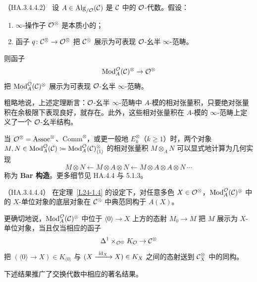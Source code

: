 \begin{theorem}\label{L24-1.4}（HA.3.4.4.2）
设 $A\in\operatorname{Alg}_{/\mathcal{O}}(\mathcal{C})$ 是 $\mathcal{C}$ 中的 $\mathcal{O}$-代数。假设：
\begin{enumerate}[label=(\roman*),leftmargin=2.4em,itemsep=0.1em]
\item $\infty$-操作子 $\mathcal{O}^{\otimes}$ 是本质小的；
\item 函子 $q\colon\mathcal{C}^{\otimes}\to\mathcal{O}^{\otimes}$ 把 $\mathcal{C}^{\otimes}$ 展示为可表现 $\mathcal{O}$-幺半 $\infty$-范畴。
\end{enumerate}
则函子
\[
\operatorname{Mod}^{\mathcal{O}}_{A}(\mathcal{C})^{\otimes}\to\mathcal{O}^{\otimes}
\]
把 $\operatorname{Mod}^{\mathcal{O}}_{A}(\mathcal{C})^{\otimes}$ 展示为可表现 $\mathcal{O}$-幺半 $\infty$-范畴。
\end{theorem}

\begin{remark}\label{L24-1.5}
粗略地说，上述定理断言：$\mathcal{O}$-幺半 $\infty$-范畴中 $A$-模的相对张量积，只要绝对张量积在余极限下表现良好，就存在。此外，这些相对张量积在 $A$-模的 $\infty$-范畴上定义了一个 $\mathcal{O}$-幺半结构。
\end{remark}

\begin{remark}\label{L24-1.6}
当 $\mathcal{O}^{\otimes}=\mathrm{Assoc}^{\otimes}$、$\mathrm{Comm}^{\otimes}$，或更一般地 $E_{k}^{\otimes}$（$k\ge1$）时，两个对象 $M,N\in\operatorname{Mod}^{\mathcal{O}}_{A}(\mathcal{C})\coloneqq\operatorname{Mod}^{\mathcal{O}}_{A}(\mathcal{C})^{\otimes}_{\langle 1\rangle}$ 的相对张量积 $M\otimes_{A}N$ 可以显式地计算为几何实现
\[
M\otimes N\longleftarrow M\otimes A\otimes N\longleftarrow M\otimes A\otimes A\otimes N\ \cdots
\]
称为 \textbf{Bar 构造}。更多细节见 HA.4.4 与 5.1.3。
\end{remark}

\begin{proposition}\label{L24-1.7}（HA.3.4.4.4）
在定理~\ref{L24-1.4} 的设定下，对任意多色 $X\in\mathcal{O}^{\otimes}$，$\operatorname{Mod}^{\mathcal{O}}_{A}(\mathcal{C})^{\otimes}$ 中的 $X$-单位对象的底层对象在 $\mathcal{C}^{\otimes}$ 中典范同构于 $A(X)$。
\end{proposition}

\begin{remark}\label{L24-1.8}
更确切地说，$\operatorname{Mod}^{\mathcal{O}}_{A}(\mathcal{C})^{\otimes}$ 中位于 $\langle 0\rangle\to X$ 上方的态射 $M_{0}\to M$ 把 $M$ 展示为 $X$-单位对象，当且仅当相应的函子
\[
\Delta^{1}\times_{\mathcal{O}^{\otimes}}K_{\mathcal{O}}\to\mathcal{C}^{\otimes}
\]
把 $(\langle 0\rangle\to X)\in K_{\langle 0\rangle}$ 与 $(X\xrightarrow{\ \operatorname{id}_{X}\ }X)\in K_{X}$ 之间的态射送到 $\mathcal{C}^{\otimes}_{X}$ 中的同构。
\end{remark}

\nitem\label{L24-1.9} 下述结果推广了交换代数中相应的著名结果。

